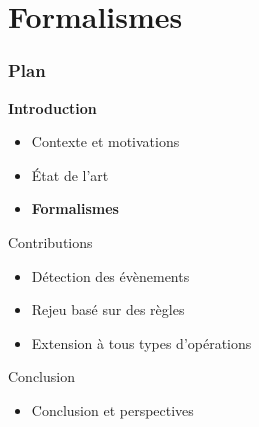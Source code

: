 \documentclass[aspectratio=1610]{beamer}
\begin{document}
\section{Formalismes}
\begin{frame}
	\frametitle{Plan}
	\centering
	\begin{minipage}{\textwidth}
    \raggedright
  \begin{minipage}{.55\textwidth}
		\begin{mytocblock}{\textbf{Introduction}}
			\begin{itemize}
				\item[] Contexte et motivations
				\item[] État de l'art
				\item[]\textbf{Formalismes}
			\end{itemize}
		\end{mytocblock}
  \end{minipage}

  \vspace{1em}

  \begin{minipage}{.55\textwidth}
    \begin{mytocblock}{Contributions}
			\begin{itemize}
				\item[] Détection des évènements
				\item[] Rejeu basé sur des règles
				\item[] Extension à tous types d'opérations
			\end{itemize}
		\end{mytocblock}
  \end{minipage}

  \vspace{1em}

  \begin{minipage}{.55\textwidth}
    \begin{mytocblock}{Conclusion}
			\begin{itemize}
				\item[] Conclusion et perspectives
			\end{itemize}
		\end{mytocblock}
  \end{minipage}
\end{minipage}
\end{frame}

\end{document}
